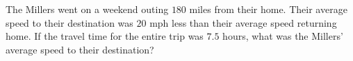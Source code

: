 The Millers went on a weekend outing $180$ miles from their home. Their average speed to their destination was $20$ mph less than their average speed returning home. If the travel time for the entire trip was $7.5$ hours, what was the Millers' average speed to their destination?
